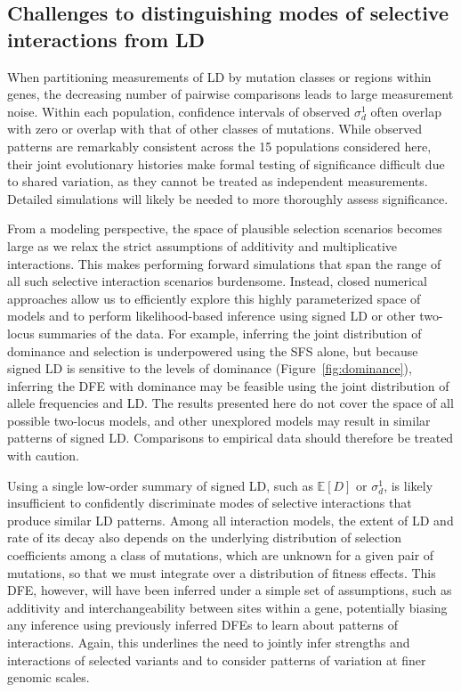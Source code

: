 \documentclass[]{article}
\newcommand{\E}{\mathbb{E}}
\begin{document}
\subsection{Challenges to distinguishing modes of selective interactions from LD}

When partitioning measurements of LD by mutation classes or regions within
genes, the decreasing number of pairwise comparisons leads to large
measurement noise. Within each population, confidence intervals of observed
\(\sigma_d^1\) often overlap with zero or overlap with that of other classes of
mutations. While observed patterns are remarkably consistent across the 15
populations considered here, their joint evolutionary histories make formal
testing of significance difficult due to shared variation, as they cannot be
treated as independent measurements. Detailed simulations will likely
be needed to more thoroughly assess significance.

From a modeling perspective, the space of plausible selection scenarios becomes
large as we relax the strict assumptions of additivity and multiplicative
interactions. This makes performing forward simulations that span the range of
all such selective interaction scenarios burdensome. Instead, closed numerical
approaches allow us to efficiently explore this highly parameterized space of
models and to perform likelihood-based inference using signed LD or other
two-locus summaries of the data. For example, inferring the joint distribution
of dominance and selection is underpowered using the SFS alone, but because
signed LD is sensitive to the levels of dominance (Figure~\ref{fig:dominance}),
inferring the DFE with dominance may be feasible using the joint distribution
of allele frequencies and LD. The results presented here do not cover the space
of all possible two-locus models, and other unexplored models may result in
similar patterns of signed LD.  Comparisons to empirical data should therefore
be treated with caution.

Using a single low-order summary of signed LD, such as \(\E[D]\) or
\(\sigma_d^1\), is likely insufficient to confidently discriminate modes of
selective interactions that produce similar LD patterns. Among all interaction
models, the extent of LD and rate of its decay also depends on the underlying
distribution of selection coefficients among a class of mutations, which are
unknown for a given pair of mutations, so that we must integrate over a
distribution of fitness effects. This DFE, however, will have been inferred
under a simple set of assumptions, such as additivity and interchangeability
between sites within a gene, potentially biasing any inference using previously
inferred DFEs to learn about patterns of interactions. Again, this underlines
the need to jointly infer strengths and interactions of selected variants and
to consider patterns of variation at finer genomic scales.
\end{document}
